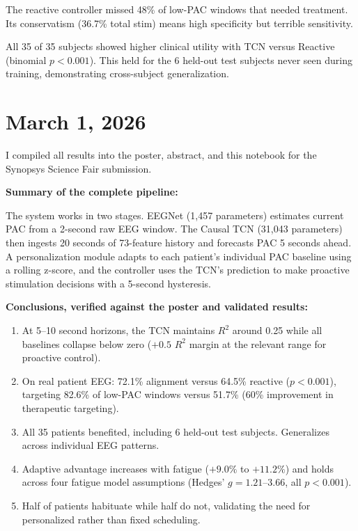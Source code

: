 \documentclass[11pt,letterpaper]{article}
\begin{document}
The reactive controller missed 48\% of low-PAC windows that needed treatment. Its conservatism
(36.7\% total stim) means high specificity but terrible sensitivity.

All 35 of 35 subjects showed higher clinical utility with TCN versus Reactive (binomial
$p < 0.001$). This held for the 6 held-out test subjects never seen during training,
demonstrating cross-subject generalization.

\section*{March 1, 2026}

I compiled all results into the poster, abstract, and this notebook for the Synopsys Science
Fair submission.

\textbf{Summary of the complete pipeline:}

The system works in two stages. EEGNet (1,457 parameters) estimates current PAC from a
2-second raw EEG window. The Causal TCN (31,043 parameters) then ingests 20 seconds of
73-feature history and forecasts PAC 5 seconds ahead. A personalization module adapts to each
patient's individual PAC baseline using a rolling z-score, and the controller uses the TCN's
prediction to make proactive stimulation decisions with a 5-second hysteresis.

\textbf{Conclusions, verified against the poster and validated results:}

\begin{enumerate}[noitemsep]
  \item At 5--10 second horizons, the TCN maintains $R^2$ around 0.25 while all baselines
        collapse below zero ($+0.5$ $R^2$ margin at the relevant range for proactive control).
  \item On real patient EEG: 72.1\% alignment versus 64.5\% reactive ($p < 0.001$), targeting
        82.6\% of low-PAC windows versus 51.7\% (60\% improvement in therapeutic targeting).
  \item All 35 patients benefited, including 6 held-out test subjects. Generalizes across
        individual EEG patterns.
  \item Adaptive advantage increases with fatigue ($+9.0\%$ to $+11.2\%$) and holds across
        four fatigue model assumptions (Hedges' $g = 1.21$--$3.66$, all $p < 0.001$).
  \item Half of patients habituate while half do not, validating the need for personalized
        rather than fixed scheduling.
\end{enumerate}
\end{document}
